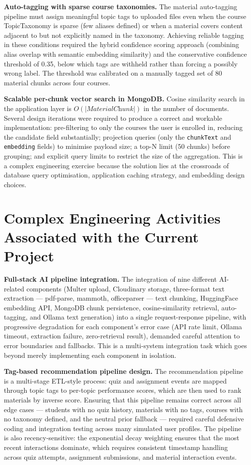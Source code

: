 \documentclass[12pt,a4paper]{report}
\begin{document}
\textbf{Auto-tagging with sparse course taxonomies.} The material auto-tagging pipeline must assign meaningful topic tags to uploaded files even when the course TopicTaxonomy is sparse (few aliases defined) or when a material covers content adjacent to but not explicitly named in the taxonomy. Achieving reliable tagging in these conditions required the hybrid confidence scoring approach (combining alias overlap with semantic embedding similarity) and the conservative confidence threshold of 0.35, below which tags are withheld rather than forcing a possibly wrong label. The threshold was calibrated on a manually tagged set of 80 material chunks across four courses.

\textbf{Scalable per-chunk vector search in MongoDB.} Cosine similarity search in the application layer is $O(|\textit{MaterialChunk}|)$ in the number of documents. Several design iterations were required to produce a correct and workable implementation: pre-filtering to only the courses the user is enrolled in, reducing the candidate field substantially; projection queries (only the \texttt{chunkText} and \texttt{embedding} fields) to minimise payload size; a top-N limit (50 chunks) before grouping; and explicit query limits to restrict the size of the aggregation. This is a complex engineering exercise because the solution lies at the crossroads of database query optimisation, application caching strategy, and embedding design choices.

\section{Complex Engineering Activities Associated with the Current Project}

\textbf{Full-stack AI pipeline integration.} The integration of nine different AI-related components (Multer upload, Cloudinary storage, three-format text extraction --- pdf-parse, mammoth, officeparser --- text chunking, HuggingFace embedding API, MongoDB chunk persistence, cosine-similarity retrieval, auto-tagging, and Ollama text generation) into a single request-response pipeline, with progressive degradation for each component's error case (API rate limit, Ollama timeout, extraction failure, zero-retrieval result), demanded careful attention to error boundaries and fallbacks. This is a multi-system integration task which goes beyond merely implementing each component in isolation.

\textbf{Tag-based recommendation pipeline design.} The recommendation pipeline is a multi-stage ETL-style process: quiz and assignment events are mapped through topic tags to per-topic performance scores, which are then used to rank materials by inverse score. Ensuring that this pipeline remains correct across all edge cases --- students with no quiz history, materials with no tags, courses with no taxonomy defined, and the neutral prior fallback --- required careful defensive coding and integration testing across many simulated user profiles. The pipeline is also recency-sensitive: the exponential decay weighting ensures that the most recent interactions dominate, which requires consistent timestamp handling across quiz attempts, assignment submissions, and material interaction events.
\end{document}
